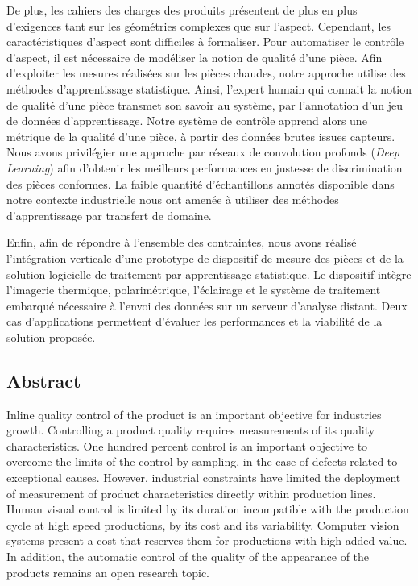 De plus, les cahiers des charges des produits présentent de plus en plus d'exigences tant sur les géométries complexes que sur l'aspect.
Cependant, les caractéristiques d'aspect sont difficiles à formaliser.
Pour automatiser le contrôle d'aspect, il est nécessaire de modéliser la notion de qualité d'une pièce.
Afin d'exploiter les mesures réalisées sur les pièces chaudes, notre approche utilise des méthodes d'apprentissage statistique.
Ainsi, l'expert humain qui connait la notion de qualité d'une pièce transmet son savoir au système, par l'annotation d'un jeu de données d'apprentissage.
Notre système de contrôle apprend alors une métrique de la qualité d'une pièce, à partir des données brutes issues capteurs.
Nous avons privilégier une approche par réseaux de convolution profonds (\textit{Deep Learning}) afin d'obtenir les meilleurs performances en justesse de discrimination des pièces conformes.
La faible quantité d'échantillons annotés disponible dans notre contexte industrielle nous ont amenée à utiliser des méthodes d'apprentissage par transfert de domaine.

Enfin, afin de répondre à l'ensemble des contraintes, nous avons réalisé l'intégration verticale d'une prototype de dispositif de mesure des pièces et de la solution logicielle de traitement par apprentissage statistique.
Le dispositif intègre l'imagerie thermique, polarimétrique, l'éclairage et le système de traitement embarqué nécessaire à l'envoi des données sur un serveur d'analyse distant.
Deux cas d'applications permettent d'évaluer les performances et la viabilité de la solution proposée.

\newpage
\vspace*{-1cm}
\begin{flushright}
	\section*{\fontsize{20pt}{20pt}\selectfont\textnormal{Abstract}}
\end{flushright}
\vspace{2cm}

Inline quality control of the product is an important objective for industries growth.
Controlling a product quality requires measurements of its quality characteristics.
One hundred percent control is an important objective to overcome the limits of the control by sampling, in the case of defects related to exceptional causes.
However, industrial constraints have limited the deployment of measurement of product characteristics directly within production lines.
Human visual control is limited by its duration incompatible with the production cycle at high speed productions, by its cost and its variability.
Computer vision systems present a cost that reserves them for productions with high added value.
In addition, the automatic control of the quality of the appearance of the products remains an open research topic.

